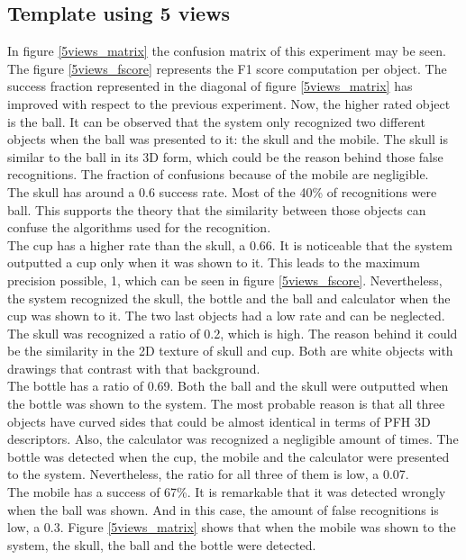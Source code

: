 	\subsection{Template using 5 views}
	In figure \ref{5views_matrix} the confusion matrix of this experiment may be seen.
	The figure \ref{5views_fscore} represents the F1 score computation per object.  
	The success fraction represented in the diagonal of figure \ref{5views_matrix} has improved with respect to the previous experiment. 
	Now, the higher rated object is the ball. 
	It can be observed that the system only recognized two different objects when the ball was presented to it: the skull and the mobile. 
	The skull is similar to the ball in its 3D form, which could be the reason behind those false recognitions. 
	The fraction of confusions because of the mobile are negligible. 
	\\
	The skull has around a 0.6 success rate. 
	Most of the 40\% of recognitions were ball. 
	This supports the theory that the similarity between those objects can confuse the algorithms used for the recognition. 
	\\
	The cup has a higher rate than the skull, a 0.66. 
	It is noticeable that the system outputted a cup only when it was shown to it. 
	This leads to the maximum precision possible, 1, which can be seen in figure \ref{5views_fscore}.
	Nevertheless, the system recognized the skull, the bottle and the ball and calculator when the cup was shown to it. 
	The two last objects had a low rate and can be neglected. 
	The skull was recognized a ratio of 0.2, which is high. 
	The reason behind it could be the similarity in the 2D texture of skull and cup. 
	Both are white objects with drawings that contrast with that background. 
	\\
	The bottle has a ratio of 0.69. 
	Both the ball and the skull were outputted when the bottle was shown to the system. 
	The most probable reason is that all three objects have curved sides that could be almost identical in terms of PFH 3D descriptors. 
	Also, the calculator was recognized a negligible amount of times. 
	The bottle was detected when the cup, the mobile and the calculator were presented to the system. 
	Nevertheless, the ratio for all three of them is low, a 0.07. 
	\\
	The mobile has a success of 67\%. 
	It is remarkable that it was detected wrongly when the ball was shown. 
	And in this case, the amount of false recognitions is low, a 0.3. 
	Figure \ref{5views_matrix} shows that when the mobile was shown to the system, the skull, the ball and the bottle were detected. 
